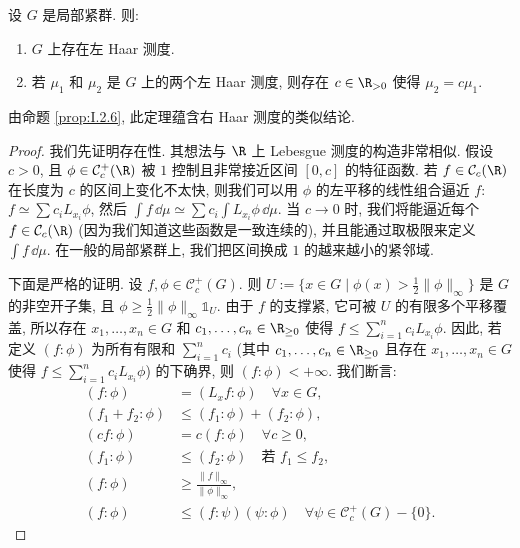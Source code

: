 \begin{theorem}
\label{thm:I.2.7}
设 $G$ 是局部紧群. 则:
\begin{enumerate}
\item[(1)] $G$ 上存在左 Haar 测度.
\item[(2)] 若 $\mu_1$ 和 $\mu_2$ 是 $G$ 上的两个左 Haar 测度, 则存在 $c \in \R_{>0}$ 使得 $\mu_2 = c\mu_1$.
\end{enumerate}
\end{theorem}

由命题 \ref{prop:I.2.6}, 此定理蕴含右 Haar 测度的类似结论.

\begin{proof}
我们先证明存在性. 其想法与 $\R$ 上 Lebesgue 测度的构造非常相似. 假设 $c > 0$, 且 $\phi \in \mathcal{C}_c^+(\R)$ 被 $1$ 控制且非常接近区间 $[0,c]$ 的特征函数. 若 $f \in \mathcal{C}_c(\R)$ 在长度为 $c$ 的区间上变化不太快, 则我们可以用 $\phi$ 的左平移的线性组合逼近 $f$: $f \simeq \sum c_iL_{x_i}\phi$, 然后 $\int f \,\dd\mu \simeq \sum c_i \int L_{x_i}\phi \,\dd\mu$. 当 $c \to 0$ 时, 我们将能逼近每个 $f \in \mathcal{C}_c(\R)$ (因为我们知道这些函数是一致连续的), 并且能通过取极限来定义 $\int f \,\dd\mu$. 在一般的局部紧群上, 我们把区间换成 $1$ 的越来越小的紧邻域.

下面是严格的证明. 设 $f, \phi \in \mathcal{C}_c^+(G)$. 则 $U := \{x \in G \mid \phi(x) > \frac{1}{2}\|\phi\|_{\infty}\}$ 是 $G$ 的非空开子集, 且 $\phi \geq \frac{1}{2}\|\phi\|_{\infty}\mathbb{1}_U$. 由于 $f$ 的支撑紧, 它可被 $U$ 的有限多个平移覆盖, 所以存在 $x_1, \ldots, x_n \in G$ 和 $c_1, \ldots, c_n \in \R_{\geq 0}$ 使得 $f \leq \sum_{i=1}^n c_iL_{x_i}\phi$. 因此, 若定义 $(f : \phi)$ 为所有有限和 $\sum_{i=1}^n c_i$ (其中 $c_1, \ldots, c_n \in \R_{\geq 0}$ 且存在 $x_1, \ldots, x_n \in G$ 使得 $f \leq \sum_{i=1}^n c_iL_{x_i}\phi$) 的下确界, 则 $(f : \phi) < +\infty$. 我们断言:
\begin{align}
\label{eq:I.2.1}
(f : \phi) &= (L_xf : \phi) \quad \forall x \in G, \\
\label{eq:I.2.2}
(f_1 + f_2 : \phi) &\leq (f_1 : \phi) + (f_2 : \phi), \\
\label{eq:I.2.3}
(cf : \phi) &= c(f : \phi) \quad \forall c \geq 0, \\
\label{eq:I.2.4}
(f_1 : \phi) &\leq (f_2 : \phi) \quad \text{若 } f_1 \leq f_2, \\
\label{eq:I.2.5}
(f : \phi) &\geq \frac{\|f\|_{\infty}}{\|\phi\|_{\infty}}, \\
\label{eq:I.2.6}
(f : \phi) &\leq (f : \psi)(\psi : \phi) \quad \forall \psi \in \mathcal{C}_c^+(G) - \{0\}.
\end{align}


\end{proof}
